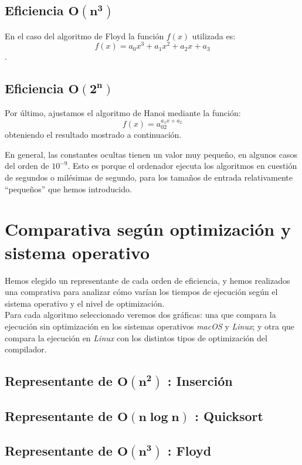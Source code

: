 \documentclass[11pt]{article}
\begin{document}
\subsection*{Eficiencia $\boldsymbol{O(n^3)}$}

En el caso del algoritmo de Floyd la función $f(x)$ utilizada es: $$f(x) = a_0x^3 + a_1x^2 + a_2x + a_3$$.


\subsection*{Eficiencia $\boldsymbol{O(2^n)}$}

Por último, ajustamos el algoritmo de Hanoi mediante la función: $$f(x) = a_02^{a_{1}x + a_2}$$ obteniendo el resultado mostrado a continuación.


En general, las constantes ocultas tienen un valor muy pequeño, en algunos casos del orden de $10^{-9}$. Esto es porque el ordenador ejecuta los algoritmos en cuestión de segundos o milésimas de segundo, para los tamaños de entrada relativamente “pequeños” que hemos introducido.

\newpage

\section*{Comparativa según optimización y sistema operativo}
Hemos elegido un representante de cada orden de eficiencia, y hemos realizados una comprativa para analizar cómo varían los tiempos de ejecución según el sistema operativo y el nivel de optimización.\\

Para cada algoritmo seleccionado veremos dos gráficas: una que compara la ejecución sin optimización en los sistemas operativos \textit{macOS} y \textit{Linux}; y otra que compara la ejecución en \textit{Linux} con los distintos tipos de optimización del compilador.

\subsection*{Representante de $\boldsymbol{O(n^2)}$ : Inserción}


\subsection*{Representante de $\boldsymbol{O(n\log n)}$ : Quicksort}

\subsection*{Representante de $\boldsymbol{O(n^3)}$ : Floyd}
\end{document}

